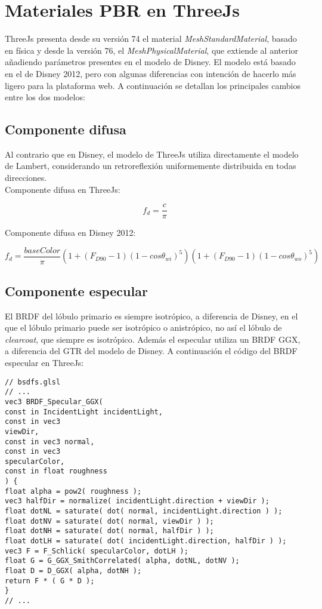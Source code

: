 \section{Materiales PBR en ThreeJs}

ThreeJs presenta desde su versi\'on 74 el material \textit{MeshStandardMaterial}, basado en f\'isica y desde la versi\'on
76, el \textit{MeshPhysicalMaterial}, que extiende al anterior a\~nadiendo par\'ametros presentes en el modelo de Disney.
El modelo est\'a basado en el de Disney 2012, pero con algunas diferencias con intenci\'on de hacerlo m\'as ligero
para la plataforma web. A continuaci\'on se detallan los principales cambios entre los dos modelos:

  \subsection{Componente difusa}
  Al contrario que en Disney, el modelo de ThreeJs utiliza directamente el modelo de Lambert, considerando un retroreflexi\'on
  uniformemente distribuida en todas direcciones.\\

  Componente difusa en ThreeJs:

  \begin{equation}
    f_d = \frac{c}{\pi}
  \end{equation}
  \singlespacing

  Componente difusa en Disney 2012:

  \begin{equation}
    f_d = \frac{baseColor}{\pi}
    \left(  1 + (F_{D90} - 1)(1 - cos\theta_{wi})^5  \right)
    \left(  1 + (F_{D90} - 1)(1 - cos\theta_{wo})^5  \right)
  \end{equation}
  \singlespacing


  \subsection{Componente especular}
  El BRDF del l\'obulo primario es siempre isotr\'opico, a diferencia de Disney, en el que el l\'obulo primario
  puede ser isotr\'opico o anistr\'opico, no as\'i el l\'obulo de \textit{clearcoat}, que siempre es isotr\'opico.
  Adem\'as el especular utiliza un BRDF GGX, a diferencia del GTR del modelo de Disney. A continuaci\'on el c\'odigo
  del BRDF especular en ThreeJs:

  \singlespacing
  \begin{lstlisting}[caption=Clase MeshClothMaterial]
// bsdfs.glsl
// ...
vec3 BRDF_Specular_GGX(
const in IncidentLight incidentLight,
const in vec3
viewDir,
const in vec3 normal,
const in vec3
specularColor,
const in float roughness
) {
float alpha = pow2( roughness );
vec3 halfDir = normalize( incidentLight.direction + viewDir );
float dotNL = saturate( dot( normal, incidentLight.direction ) );
float dotNV = saturate( dot( normal, viewDir ) );
float dotNH = saturate( dot( normal, halfDir ) );
float dotLH = saturate( dot( incidentLight.direction, halfDir ) );
vec3 F = F_Schlick( specularColor, dotLH );
float G = G_GGX_SmithCorrelated( alpha, dotNL, dotNV );
float D = D_GGX( alpha, dotNH );
return F * ( G * D );
}
// ...
  \end{lstlisting}
  \singlespacing

